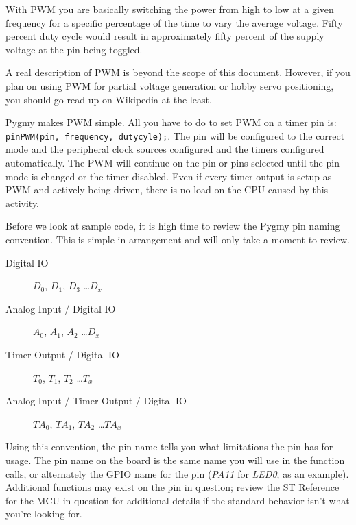 \documentclass{article}
\begin{document}
With \ac{PWM} you are basically switching the power from high to low at a given frequency for a specific percentage of the time to vary the average voltage. Fifty percent duty cycle would result in approximately fifty percent of the supply voltage at the pin being toggled.

A real description of \ac{PWM} is beyond the scope of this document. However, if you plan on using \ac{PWM} for partial voltage generation or hobby servo positioning, you should go read up on Wikipedia at the least.

Pygmy makes \ac{PWM} simple. All you have to do to set \ac{PWM} on a timer pin is: \verb|pinPWM(pin, frequency, dutycyle);|. The pin will be configured to the correct mode and the peripheral clock sources configured and the timers configured automatically. The \ac{PWM} will continue on the pin or pins selected until the pin mode is changed or the timer disabled. Even if every timer output is setup as \ac{PWM} and actively being driven, there is no load on the CPU caused by this activity.

Before we look at sample code, it is high time to review the Pygmy pin naming convention. This is simple in arrangement and will only take a moment to review.
\begin{description}
	\item[Digital IO] $D_0$, $D_1$, $D_3$ \ldots $D_x$
	\item[Analog Input / Digital IO] $A_0$, $A_1$, $A_2$ \ldots $D_x$
	\item[Timer Output / Digital IO] $T_0$, $T_1$, $T_2$ \ldots $T_x$
	\item[Analog Input / Timer Output / Digital IO] $TA_0$, $TA_1$, $TA_2$ \ldots $TA_x$
\end{description}

Using this convention, the pin name tells you what limitations the pin has for usage. The pin name on the board is the same name you will use in the function calls, or alternately the \ac{GPIO} name for the pin (\emph{PA11} for \emph{LED0}, as an example). Additional functions may exist on the pin in question; review the ST Reference for the MCU in question for additional details if the standard behavior isn't what you're looking for.
\end{document}
